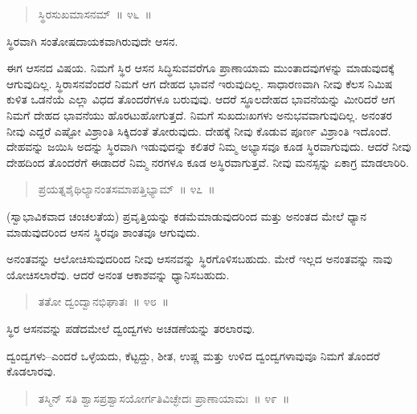 \begin{verse}
ಸ್ಥಿರಸುಖಮಾಸನಮ್​~॥ ೪೬~॥
\end{verse}

\vspace{-0.35cm}

ಸ್ಥಿರವಾಗಿ ಸಂತೋಷದಾಯಕವಾಗಿರುವುದೇ ಆಸನ. 


	
ಈಗ ಆಸನದ ವಿಷಯ. ನಿಮಗೆ ಸ್ಥಿರ ಆಸನ ಸಿದ್ಧಿಸುವವರೆಗೂ ಪ್ರಾಣಾಯಾಮ ಮುಂತಾದವುಗಳನ್ನು ಮಾಡುವುದಕ್ಕೆ ಆಗುವುದಿಲ್ಲ. ಸ್ಥಿರಾಸನವೆಂದರೆ ನಿಮಗೆ ಆಗ ದೇಹದ ಭಾವನೆ ಇರುವುದಿಲ್ಲ. ಸಾಧಾರಣವಾಗಿ ನೀವು ಕೆಲಸ ನಿಮಿಷ ಕುಳಿತ ಒಡನೆಯೆ ಎಲ್ಲಾ ವಿಧದ ತೊಂದರೆಗಳೂ ಬರುವುವು. ಆದರೆ ಸ್ಥೂಲದೇಹದ ಭಾವನೆಯನ್ನು ಮೀರಿದರೆ ಆಗ ನಿಮಗೆ ದೇಹದ ಭಾವನೆಯು ಹೊರಟುಹೋಗುತ್ತದೆ. ನಿಮಗೆ ಸುಖದುಃಖಗಳು ಅನುಭವವಾಗುವುದಿಲ್ಲ. ಅನಂತರ ನೀವು ಎದ್ದರೆ ಎಷ್ಟೋ ವಿಶ್ರಾಂತಿ ಸಿಕ್ಕಿದಂತೆ ತೋರುವುದು. ದೇಹಕ್ಕೆ ನೀವು ಕೊಡುವ ಪೂರ್ಣ ವಿಶ್ರಾಂತಿ ಇದೊಂದೆ. ದೇಹವನ್ನು ಜಯಿಸಿ ಅದನ್ನು ಸ್ಥಿರವಾಗಿ ಇಡುವುದನ್ನು ಕಲಿತರೆ ನಿಮ್ಮ ಅಭ್ಯಾಸವೂ ಕೂಡ ಸ್ಥಿರವಾಗುವುದು. ಆದರೆ ನೀವು ದೇಹದಿಂದ ತೊಂದರೆಗೆ ಈಡಾದರೆ ನಿಮ್ಮ ನರಗಳೂ ಕೂಡ ಅಸ್ಥಿರವಾಗುತ್ತವೆ. ನೀವು ಮನಸ್ಸನ್ನು ಏಕಾಗ್ರ ಮಾಡಲಾರಿರಿ. 

\vspace{-0.3cm}

\begin{verse}
ಪ್ರಯತ್ನಶೈಥಿಲ್ಯಾನಂತಸಮಾಪತ್ತಿಭ್ಯಾಮ್​~॥ ೪೭~॥
\end{verse}

\vspace{-0.3cm}

(ಸ್ವಾಭಾವಿಕವಾದ ಚಂಚಲತೆಯ) ಪ್ರವೃತ್ತಿಯನ್ನು ಕಡಮೆಮಾಡುವುದರಿಂದ ಮತ್ತು ಅನಂತದ ಮೇಲೆ ಧ್ಯಾನ ಮಾಡುವುದರಿಂದ ಆಸನ ಸ್ಥಿರವೂ ಶಾಂತವೂ ಆಗುವುದು. 

ಅನಂತವನ್ನು ಆಲೋಚಿಸುವುದರಿಂದ ನೀವು ಆಸನವನ್ನು ಸ್ಥಿರಗೊಳಿಸಬಹುದು. ಮೇರೆ ಇಲ್ಲದ ಅನಂತವನ್ನು ನಾವು ಯೋಚಿಸಲಾರೆವು. ಆದರೆ ಅನಂತ ಆಕಾಶವನ್ನು ಧ್ಯಾನಿಸಬಹುದು. 

\vspace{-0.3cm}

\begin{verse}
ತತೋ ದ್ವಂದ್ವಾನಭಿಘಾತಃ~॥ ೪೮~॥
\end{verse}

\vspace{-0.3cm}

ಸ್ಥಿರ ಆಸನವನ್ನು ಪಡೆದಮೇಲೆ ದ್ವಂದ್ವಗಳು ಅಚಡಣೆಯನ್ನು ತರಲಾರವು. 

ದ್ವಂದ್ವಗಳು–ಎಂದರೆ ಒಳ್ಳೆಯದು, ಕೆಟ್ಟದ್ದು, ಶೀತ, ಉಷ್ಣ ಮತ್ತು ಉಳಿದ ದ್ವಂದ್ವಗಳಾವುವೂ ನಿಮಗೆ ತೊಂದರೆ ಕೊಡಲಾರವು. 

\vspace{-0.3cm}

\begin{verse}
ತಸ್ಮಿನ್​ ಸತಿ ಶ್ವಾಸಪ್ರಶ್ವಾಸಯೋರ್ಗತಿವಿಚ್ಛೇದಃ ಪ್ರಾಣಾಯಾಮಃ~॥ ೪೯~॥
\end{verse}

